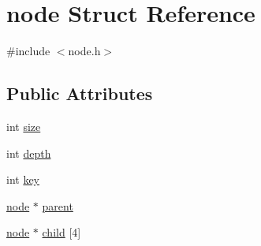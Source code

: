 \hypertarget{structnode}{\section{node \-Struct \-Reference}
\label{structnode}
}


{\ttfamily \#include $<$node.\-h$>$}

\subsection*{\-Public \-Attributes}
\begin{DoxyCompactItemize}
\item 
int \hyperlink{structnode_ad2ae38303b19ab4f3e1b16b105a78b60}{size}
\item 
int \hyperlink{structnode_a24b9265ea66a07c6ff1bcc021f400082}{depth}
\item 
int \hyperlink{structnode_aa1417e7fad3ebcf42dc0ec8b711f273d}{key}
\item 
\hyperlink{structnode}{node} $\ast$ \hyperlink{structnode_a5e88137f1d0e2f7a940bccf4c3d3a4d3}{parent}
\item 
\hyperlink{structnode}{node} $\ast$ \hyperlink{structnode_aef19e5e5e309dbf0b83cc80450ac5b50}{child} \mbox{[}4\mbox{]}
\end{DoxyCompactItemize}


